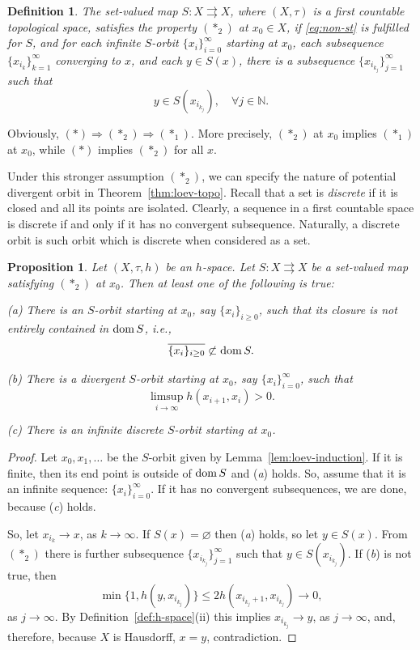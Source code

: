 \documentclass[12pt]{article}
\newtheorem{proposition}[theorem]{Proposition}
\newtheorem{definition}[theorem]{Definition}
\def\dom{\mathop{\rm dom}}
\newcommand{\astorig}{(\ast)}
\newcommand{\astone}{(\ast_1)}
\newcommand{\astwo}{(\ast_2)}
\renewcommand{\emptyset}{\varnothing}
\begin{document}
\begin{definition}
    \label{def:ast-2}
    The set-valued map $S:X\rightrightarrows X$, where $(X,\tau)$ is a first countable topological space, satisfies the property $\astwo$ at $x_0\in X$, if \eqref{eq:non-st} is fulfilled for $S$,  and for each infinite $S$-orbit $\{x_i\}_{i=0}^\infty$ starting at $x_0$, each subsequence $\{x_{i_k}\}_{k=1}^\infty$ converging to $x$, and each $y\in S(x)$, there is a subsequence $\{x_{i_{k_j}}\}_{j=1}^\infty$ such that
    $$
        y \in S(x_{i_{k_j}}),\quad\forall j\in\mathbb{N}.
    $$
\end{definition}
Obviously, $\astorig\Rightarrow\astwo\Rightarrow\astone$. More precisely, $\astwo$ at $x_0$ implies $\astone$ at $x_0$, while $\astorig$ implies $\astwo$ for all $x$.

 Under this stronger assumption $\astwo$, we can specify the nature of potential divergent orbit in Theorem~\ref{thm:loev-topo}. Recall that a set is \emph{discrete} if it is closed and all its points are isolated. Clearly, a sequence in a first countable space is discrete if and only if it has no convergent subsequence. Naturally, a discrete orbit is such orbit which is discrete when considered as a set.

\begin{proposition}
    \label{pro:loev-topo}
    Let $(X,\tau,h)$ be an $h$-space. Let $S:X\rightrightarrows X$ be a  set-valued map satisfying $\astwo$ at $x_0$. Then at least one of the following is true:

    (a) There is an $S$-orbit starting at $x_0$, say $\{x_i\}_{i\ge0}$, such that its closure is not entirely contained in $\dom S$, i.e.,
    $$
        \overline{\{x_i\}_{i\ge0}}\not\subset\dom S.
    $$

    (b) There is a divergent $S$-orbit starting at $x_0$, say $\{x_i\}_{i=0}^\infty$, such that
    $$
        \limsup_{i\to\infty} h(x_{i+1},x_i) > 0.
    $$

    (c) There is an infinite discrete $S$-orbit starting at $x_0$.
\end{proposition}
\begin{proof}
    Let $x_0,x_1,\dots$ be the $S$-orbit given by Lemma~\ref{lem:loev-induction}. If it is finite,  then its end point is outside of $\dom S$ and (\emph{a}) holds. So, assume that it is an infinite sequence: $\{x_i\}_{i=0}^\infty$. If it has no convergent subsequences, we are done, because (\emph{c}) holds.


    So, let $x_{i_k} \to x$, as $k \to \infty$. If $S(x)=\emptyset$ then (\emph{a}) holds, so let $y\in S(x)$. From $\astwo$ there is further subsequence $\{x_{i_{k_j}}\}_{j=1}^\infty$ such that $y\in S(x_{i_{k_j}})$. If (\emph{b}) is not true, then
    $$
        \min\{1, h(y,x_{i_{k_j}})\} \le  2 h(x_{i_{k_j}+1}, x_{i_{k_j}}) \to 0,
    $$
    as $j\to\infty$. By  Definition~\ref{def:h-space}(ii) this implies $x_{i_{k_j}} \to y$, as $j\to\infty$, and, therefore, because $X$ is Hausdorff, $x=y$, contradiction.
\end{proof}
\end{document}
